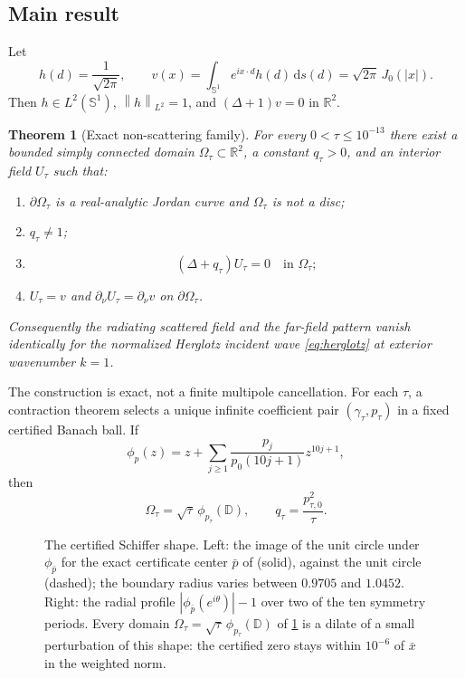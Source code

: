\documentclass[11pt]{amsart}
\newtheorem{theorem}{Theorem}[section]
\newcommand{\D}{\mathbb D}
\newcommand{\R}{\mathbb R}
\newcommand{\Sone}{\mathbb S^1}
\newcommand{\norm}[1]{\left\lVert #1\right\rVert}
\newcommand{\abs}[1]{\left\lvert #1\right\rvert}
\newcommand{\dd}{\,\mathrm d}
\begin{document}
\subsection{Main result}

Let
\begin{equation}\label{eq:herglotz}
  h(d)=\frac1{\sqrt{2\pi}},
  \qquad
  v(x)=\int_{\Sone}e^{ix\cdot d}h(d)\dd s(d)
      =\sqrt{2\pi}\,J_0(\abs{x}).
\end{equation}
Then $h\in L^2(\Sone)$, $\norm{h}_{L^2}=1$, and $(\Delta+1)v=0$ in
$\R^2$.

\begin{theorem}[Exact non-scattering family]\label{thm:main}
For every $0<\tau\le10^{-13}$ there exist a bounded simply connected domain
$\Omega_\tau\subset\R^2$, a constant $q_\tau>0$, and an interior field
$U_\tau$ such that:
\begin{enumerate}[label=\textup{(\roman*)},leftmargin=2.2em]
  \item $\partial\Omega_\tau$ is a real-analytic Jordan curve and
  $\Omega_\tau$ is not a disc;
  \item $q_\tau\ne1$;
  \item
  \[
    (\Delta+q_\tau)U_\tau=0\quad\text{in }\Omega_\tau;
  \]
  \item $U_\tau=v$ and
  $\partial_\nu U_\tau=\partial_\nu v$ on $\partial\Omega_\tau$.
\end{enumerate}
Consequently the radiating scattered field and the far-field pattern vanish
identically for the normalized Herglotz incident wave \eqref{eq:herglotz} at
exterior wavenumber $k=1$.
\end{theorem}

The construction is exact, not a finite multipole cancellation.  For each
$\tau$, a contraction theorem selects a unique infinite coefficient pair
$(\gamma_\tau,p_\tau)$ in a fixed certified Banach ball.  If
\begin{equation}\label{eq:phi}
  \phi_p(z)=z+\sum_{j\ge1}
  \frac{p_j}{p_0(10j+1)}z^{10j+1},
\end{equation}
then
\begin{equation}\label{eq:Omegaq}
  \Omega_\tau=\sqrt\tau\,\phi_{p_\tau}(\D),
  \qquad
  q_\tau=\frac{p_{\tau,0}^2}{\tau}.
\end{equation}

\begin{figure}[t]
  \centering
  
  \caption{The certified Schiffer shape.  Left: the image of the unit
  circle under $\phi_{\bar p}$ for the exact certificate center $\bar p$
  of \cite{ColbrookStepaniants2026,ColbrookStepaniantsCert2026} (solid),
  against the unit circle (dashed); the boundary radius varies between
  $0.9705$ and $1.0452$.  Right: the radial profile
  $\abs{\phi_{\bar p}(e^{i\theta})}-1$ over two of the ten symmetry
  periods.  Every domain $\Omega_\tau=\sqrt\tau\,\phi_{p_\tau}(\D)$ of
  \cref{thm:main} is a dilate of a small perturbation of this shape: the
  certified zero stays within $10^{-6}$ of $\bar x$ in the weighted norm.}
  \label{fig:domain}
\end{figure}
\end{document}
